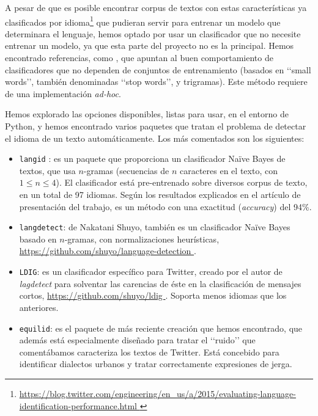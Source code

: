 A pesar de que es posible encontrar corpus de textos con estas características 
ya clasificados por 
idioma\footnote{\url{https://blog.twitter.com/engineering/en_us/a/2015/evaluating-language-identification-performance.html }}
que pudieran servir para entrenar un modelo que determinara el lenguaje,
hemos optado por usar un clasificador que no necesite entrenar un modelo, 
ya que esta parte del proyecto no es la principal. Hemos encontrado
referencias, como \cite{almeida_estevez_piad}, que apuntan al buen comportamiento de 
clasificadores que no dependen de conjuntos de entrenamiento (basados en \lq\lq small words\rq\rq,
también denominadas \lq\lq stop words\rq\rq, y trigramas). Este método requiere de una implementación
{\em ad-hoc}.

Hemos explorado las opciones disponibles, listas para usar, en el entorno de Python, 
y hemos encontrado varios paquetes que tratan el 
problema de detectar el idioma de un texto automáticamente. Los más
comentados son los siguientes:
\begin{itemize} 
\item {\tt langid} \cite{langid}: es un paquete que proporciona un 
clasificador Naïve Bayes de textos, que usa $n$-gramas (secuencias de $n$ caracteres en el texto, con $1\leq n\leq 4$). 
El clasificador está pre-entrenado sobre diversos corpus de texto, en un total de 97 idiomas. Según los
resultados explicados en el artículo de presentación del trabajo, es un método con una
exactitud ({\em accuracy}) del 94\%.
\item {\tt langdetect}: de Nakatani Shuyo, también es un clasificador Naïve Bayes basado en $n$-gramas, con
normalizaciones heurísticas, \url{https://github.com/shuyo/language-detection }.
\item {\tt LDIG}: es un clasificador específico para Twitter, creado por el autor
de {\em lagdetect} para solventar las carencias de éste en la clasificación de mensajes
cortos, \url{https://github.com/shuyo/ldig }. Soporta menos idiomas que los anteriores.
\item {\tt equilid}: es el paquete de más reciente creación que hemos encontrado,
que además está especialmente diseñado para tratar el \lq\lq ruido\rq\rq
que comentábamos caracteriza los textos de Twitter. Está concebido para identificar
dialectos urbanos y tratar correctamente expresiones de jerga.
\end{itemize}

